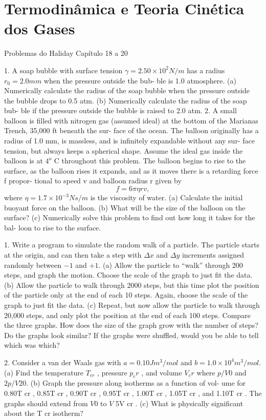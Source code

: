 \chapter{Termodinâmica e Teoria Cinética dos Gases}
Problemas do Haliday Capítulo 18 a 20

1. A soap bubble with surface tension $\gamma = 2.50 \times 10^2 N/m$
has a radius $r_0 = 2.0 mm$ when the pressure outside the bub-
ble is 1.0 atmosphere. (a) Numerically calculate the radius of
the soap bubble when the pressure outside the bubble drops to
0.5 atm. (b) Numerically calculate the radius of the soap bub-
ble if the pressure outside the bubble is raised to 2.0 atm.
2. A small balloon is filled with nitrogen gas (assumed ideal) at
the bottom of the Marianas Trench, 35,000 ft beneath the sur-
face of the ocean. The balloon originally has a radius of 1.0
mm, is massless, and is infinitely expandable without any sur-
face tension, but always keeps a spherical shape. Assume the
ideal gas inside the balloon is at $4^o$ C throughout this problem.
The balloon begins to rise to the surface, as the balloon rises
it expands, and as it moves there is a retarding force f propor-
tional to speed v and balloon radius r given by
\[f = 6\pi \eta rv,\]
where $\eta = 1.7 \times 10^{-3} N s/m$ is the viscosity of water. (a)
Calculate the initial buoyant force on the balloon. (b) What
will be the size of the balloon on the surface? (c) Numerically
solve this problem to find out how long it takes for the bal-
loon to rise to the surface.

1. Write a program to simulate the random walk of a particle.
The particle starts at the origin, and can then take a step with
$\Delta x$ and $\Delta y$ increments assigned randomly between $-1$ and $+1$.
(a) Allow the particle to “walk” through 200 steps, and graph
the motion. Choose the scale of the
graph to just fit the data. (b) Allow the particle to walk
through 2000 steps, but this time plot the position of the particle only at the end of each 10 steps. Again, choose the scale
of the graph to just fit the data. (c) Repeat, but now allow the
particle to walk through 20,000 steps, and only plot the position at the end of each 100 steps. Compare the three graphs.
How does the size of the graph grow with the number of
steps? Do the graphs look similar? If the graphs were shuffled, would you be able to tell which was which?

2. Consider a van der Waals gas with $a = 0.10 J m^3 /mol$ and
$b = 1.0 \times 10^4 m^3 /mol$. (a) Find the temperature $T_{cr}$ , pressure $p_cr$ , and volume $V_cr$ where $p/V 0$ and $2 p/V20$.
(b) Graph the pressure along isotherms as a function of vol-
ume for 0.80T cr , 0.85T cr , 0.90T cr , 0.95T cr , 1.00T cr , 1.05T cr ,
and 1.10T cr . The graphs should extend from $V 0$ to $V$ 
5V cr . (c) What is physically significant about the T cr isotherm?

